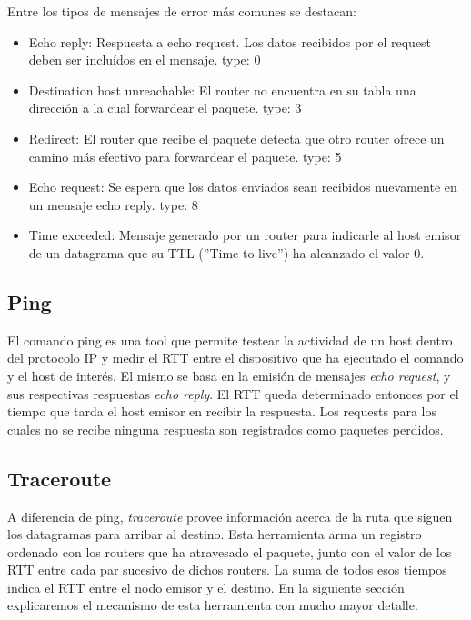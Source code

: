 Entre los tipos de mensajes de error más comunes se destacan:
\begin{itemize}
  \item Echo reply: Respuesta a echo request. Los datos recibidos por el request deben ser incluídos
  en el mensaje. type: 0
  \item Destination host unreachable: El router no encuentra en su tabla una dirección a la cual
  forwardear el paquete. type: 3
  \item Redirect: El router que recibe el paquete detecta que otro router ofrece un camino más
  efectivo para forwardear el paquete. type: 5
  \item Echo request: Se espera que los datos enviados sean recibidos nuevamente en un mensaje echo
  reply. type: 8
  \item Time exceeded: Mensaje generado por un router para indicarle al host emisor de un datagrama
  que su TTL (''Time to live'') ha alcanzado el valor 0.

\end{itemize}


\subsection{Ping}

El comando ping es una tool que permite testear la actividad de un host dentro del protocolo IP y medir
el RTT entre el dispositivo que ha ejecutado el comando y el host de interés. El mismo se basa en
la emisión de mensajes \emph{echo request}, y sus respectivas respuestas \emph{echo reply}. El RTT queda
determinado entonces por el tiempo que tarda el host emisor en recibir la respuesta.
Los requests para los cuales no se recibe ninguna respuesta son registrados como paquetes perdidos.

\subsection{Traceroute}

A diferencia de ping, \emph{traceroute} provee información acerca de la ruta que siguen los datagramas
para arribar al destino. Esta herramienta arma un registro ordenado con los routers que ha atravesado
el paquete, junto con el valor de los RTT entre cada par sucesivo de dichos routers. La suma de todos
esos tiempos indica el RTT entre el nodo emisor y el destino. En la siguiente sección explicaremos el
mecanismo de esta herramienta con mucho mayor detalle.
